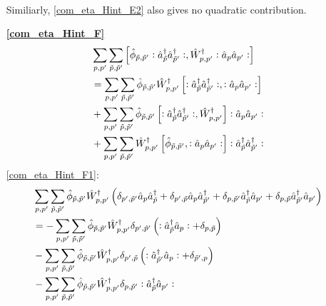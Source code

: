 \begin{appendix}
\begin{itemize}
\begin{align}
\end{align}
Similiarly, \ref{com_eta_Hint_E2} also gives no quadratic contribution.
\item[\textbf{\ref{com_eta_Hint_F}}] 
\begin{subequations}
\begin{align}
&\sum\limits_{p, p^\prime}\sum\limits_{\tilde p,\tilde p^\prime} \left[\hat\phi_{\tilde p,\tilde p^\prime}\vcentcolon\hat a^\dagger_{\tilde p}\hat a^\dagger_{\tilde p^\prime}\vcentcolon,\hat W_{p,p^\prime}^\dagger\vcentcolon\hat a_p\hat a_{p^\prime}\vcentcolon\right]\nonumber\\
&=\sum\limits_{p, p^\prime}\sum\limits_{\tilde p,\tilde p^\prime} \hat\phi_{\tilde p,\tilde p^\prime}\hat W_{p,p^\prime}^\dagger\left[\vcentcolon\hat a^\dagger_{\tilde p}\hat a^\dagger_{\tilde p^\prime}\vcentcolon,\vcentcolon\hat a_p\hat a_{p^\prime}\vcentcolon\right]\label{com_eta_Hint_F1}\\
&+\sum\limits_{p, p^\prime}\sum\limits_{\tilde p,\tilde p^\prime}\hat\phi_{\tilde p,\tilde p^\prime} \left[\vcentcolon\hat a^\dagger_{\tilde p}\hat a^\dagger_{\tilde p^\prime}\vcentcolon,\hat W_{p,p^\prime}^\dagger\right]\vcentcolon\hat a_p\hat a_{p^\prime}\vcentcolon\label{com_eta_Hint_F2}\\
&+\sum\limits_{p, p^\prime}\sum\limits_{\tilde p,\tilde p^\prime}\hat W_{p,p^\prime}^\dagger \left[\hat\phi_{\tilde p,\tilde p^\prime},\vcentcolon\hat a_p\hat a_{p^\prime}\vcentcolon\right]\vcentcolon\hat a^\dagger_{\tilde p}\hat a^\dagger_{\tilde p^\prime}\vcentcolon\label{com_eta_Hint_F3}
\end{align}
\end{subequations}
\ref{com_eta_Hint_F1}:
\begin{align}
&\Sum_{p, p^\prime}\Sum_{\tilde p,\tilde p^\prime} \hat\phi_{\tilde p,\tilde p^\prime}\hat W_{p,p^\prime}^\dagger\left(\delta_{p^\prime,\tilde p^\prime}\AN_p\CR_{\tilde p}+\delta_{p^\prime,\tilde p}\AN_p\CR_{\tilde p^\prime}+\delta_{p,\tilde p^\prime}\CR_{\tilde p}\AN_{p^\prime}+\delta_{p,\tilde p}\CR_{\tilde p^\prime}\AN_{p^\prime}\right)\nonumber\\
&=-\Sum_{p, p^\prime}\Sum_{\tilde p,\tilde p^\prime} \hat\phi_{\tilde p,\tilde p^\prime}\hat W_{p,p^\prime}^\dagger \delta_{p^\prime,\tilde p^\prime}\left(\NO\CR_{\tilde p}\AN_p\NO+\delta_{p,\tilde p}\right) \\
&-\Sum_{p, p^\prime}\Sum_{\tilde p,\tilde p^\prime} \hat\phi_{\tilde p,\tilde p^\prime}\hat W_{p,p^\prime}^\dagger \delta_{p^\prime,\tilde p}\left(\NO\CR_{\tilde p^\prime}\AN_p\NO+\delta_{\tilde p^\prime,p}\right) \nonumber\\
&-\Sum_{p, p^\prime}\Sum_{\tilde p,\tilde p^\prime} \hat\phi_{\tilde p,\tilde p^\prime}\hat W_{p,p^\prime}^\dagger \delta_{p,\tilde p^\prime}\NO\CR_{\tilde p}\AN_{p^\prime}\NO \nonumber\\

\end{align}
\end{itemize}
\end{appendix}
